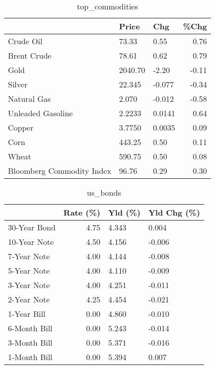 \documentclass{article}%
\begin{document}
\begin{table}[htbp]%
\caption{top\_commodities}%
\centering%
\begin{adjustbox}{width=1\textwidth}%
\begin{tabular}{lllr}
\toprule
                          &   Price &    Chg &  \%Chg \\
\midrule
               Crude Oil  &   73.33 &   0.55 &  0.76 \\
             Brent Crude  &   78.61 &   0.62 &  0.79 \\
                    Gold  & 2040.70 &  -2.20 & -0.11 \\
                  Silver  &  22.345 & -0.077 & -0.34 \\
             Natural Gas  &   2.070 & -0.012 & -0.58 \\
       Unleaded Gasoline  &  2.2233 & 0.0141 &  0.64 \\
                  Copper  &  3.7750 & 0.0035 &  0.09 \\
                    Corn  &  443.25 &   0.50 &  0.11 \\
                   Wheat  &  590.75 &   0.50 &  0.08 \\
Bloomberg Commodity Index &   96.76 &   0.29 &  0.30 \\
\bottomrule
\end{tabular}
%
\end{adjustbox}%
\end{table}

%


\begin{table}[htbp]%
\caption{us\_bonds}%
\centering%
\begin{adjustbox}{width=1\textwidth}%
\begin{tabular}{lrll}
\toprule
             &  Rate (\%) & Yld (\%) & Yld Chg (\%) \\
\midrule
30-Year Bond &      4.75 &   4.343 &       0.004 \\
10-Year Note &      4.50 &   4.156 &      -0.006 \\
 7-Year Note &      4.00 &   4.144 &      -0.008 \\
 5-Year Note &      4.00 &   4.110 &      -0.009 \\
 3-Year Note &      4.00 &   4.251 &      -0.011 \\
 2-Year Note &      4.25 &   4.454 &      -0.021 \\
 1-Year Bill &      0.00 &   4.860 &      -0.010 \\
6-Month Bill &      0.00 &   5.243 &      -0.014 \\
3-Month Bill &      0.00 &   5.371 &      -0.016 \\
1-Month Bill &      0.00 &   5.394 &       0.007 \\
\bottomrule
\end{tabular}
%
\end{adjustbox}%
\end{table}
\end{document}
